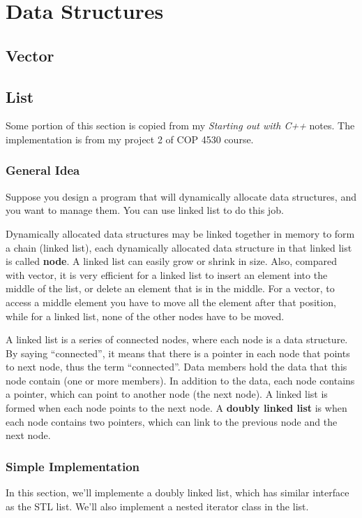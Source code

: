 \documentclass[11pt]{book}
\begin{document}
\part{Data Structures}
\label{sec:orgc859dee}
\chapter{Vector}
\label{sec:org94c793b}
\chapter{List}
\label{sec:orgeaecb39}
Some portion of this section is copied from my \emph{Starting out with C++} notes. The implementation is from my project 2 of COP 4530 course.
\section{General Idea}
\label{sec:org57f545f}
Suppose you design a program that will dynamically allocate data structures, and you want to manage them. You can use linked list to do this job.

Dynamically allocated data structures may be linked together in memory to form a chain (linked list), each dynamically allocated data structure in that linked list is called \textbf{node}. A linked list can easily grow or shrink in size. Also, compared with vector, it is very efficient for a linked list to insert an element into the middle of the list, or delete an element that is in the middle. For a vector, to access a middle element you have to move all the element after that position, while for a linked list, none of the other nodes have to be moved.

A linked list is a series of connected nodes, where each node is a data structure. By saying ``connected'', it means that there is a pointer in each node that points to next node, thus the term ``connected''. Data members hold the data that this node contain (one or more members). In addition to the data, each node contains a pointer, which can point to another node (the next node). A linked list is formed when each node points to the next node. A \textbf{doubly linked list} is when each node contains two pointers, which can link to the previous node and the next node.
\section{Simple Implementation}
\label{sec:org4ce7888}
In this section, we'll implemente a doubly linked list, which has similar interface as the STL list. We'll also implement a nested iterator class in the list.
\end{document}
